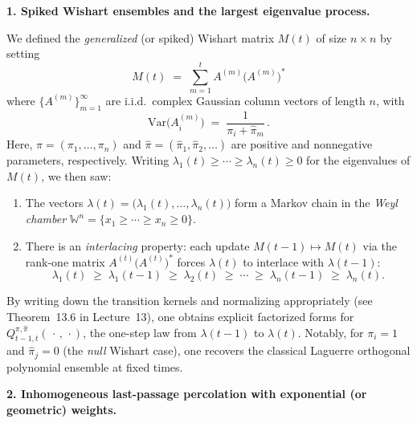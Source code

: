 \documentclass[letterpaper,11pt,oneside,reqno]{article}
\numberwithin{equation}{section}
\theoremstyle{definition}
\begin{document}
\vspace{6pt}
\noindent
\textbf{1. Spiked Wishart ensembles and the largest eigenvalue process.}
\vspace{4pt}

We defined the \emph{generalized} (or spiked) Wishart matrix $M(t)$ of size $n\times n$ by setting
\[
M(t)\;=\;\sum_{m=1}^t A^{(m)}\bigl(A^{(m)}\bigr)^*
\]
where $\{A^{(m)}\}_{m=1}^\infty$ are i.i.d.\ complex Gaussian column vectors of length $n$, with
\[
\mathrm{Var}\bigl(A^{(m)}_i\bigr)
\;=\;
\frac{1}{\pi_i + \hat\pi_m}\,.
\]
Here, $\pi=(\pi_1,\dots,\pi_n)$ and $\hat\pi=(\hat\pi_1,\hat\pi_2,\dots)$ are positive and nonnegative parameters, respectively.  Writing $\lambda_1(t)\ge\cdots\ge\lambda_n(t)\ge0$ for the eigenvalues of $M(t)$, we then saw:

\begin{enumerate}
\item The vectors $\lambda(t)=\bigl(\lambda_1(t),\dots,\lambda_n(t)\bigr)$ form a Markov chain in the \emph{Weyl chamber} $\mathbb{W}^n = \{x_1\ge\cdots\ge x_n\ge0\}$.
\item There is an \emph{interlacing} property: each update $M(t-1)\mapsto M(t)$ via the rank-one matrix $A^{(t)}\bigl(A^{(t)}\bigr)^*$ forces $\lambda(t)$ to interlace with $\lambda(t-1)$:
\[
\lambda_1(t)\;\ge\;\lambda_1(t-1)\;\ge\;\lambda_2(t)\;\ge\;\cdots\;\ge\;\lambda_n(t-1)\;\ge\;\lambda_n(t).
\]
\end{enumerate}

By writing down the transition kernels and normalizing appropriately (see Theorem~13.6 in Lecture~13), one obtains explicit factorized forms for $Q^{\pi,\hat\pi}_{t-1,t}(\,\cdot\,,\,\cdot)$, the one-step law from $\lambda(t-1)$ to $\lambda(t)$.  Notably, for $\pi_i=1$ and $\hat\pi_j=0$ (the \emph{null} Wishart case), one recovers the classical Laguerre orthogonal polynomial ensemble at fixed times.

\vspace{6pt}
\noindent
\textbf{2. Inhomogeneous last-passage percolation with exponential (or geometric) weights.}
\vspace{4pt}
\end{document}
